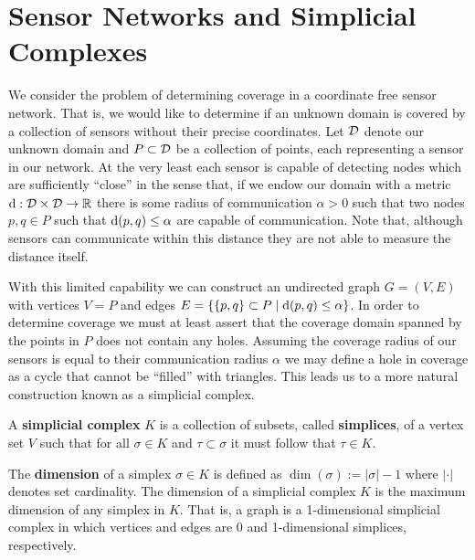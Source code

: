 \section{Sensor Networks and Simplicial Complexes} %
\label{sec:complexes}

We consider the problem of determining coverage in a coordinate free sensor network.
That is, we would like to determine if an unknown domain is covered by a collection of sensors without their precise coordinates.
Let ${\mathcal{D}}$ denote our unknown domain and $P\subset{\mathcal{D}}$ be a collection of points, each representing a sensor in our network.
At the very least each sensor is capable of detecting nodes which are sufficiently ``close'' in the sense that, if we endow our domain with a metric $\mathrm{d}:{\mathcal{D}}\times{\mathcal{D}}\to\mathbb{R}$ there is some radius of communication $\alpha > 0$ such that two nodes $p, q\in P$ such that $\mathrm{d}(p, q) \leq\alpha$ are capable of communication.
Note that, although sensors can communicate within this distance they are not able to measure the distance itself.

With this limited capability we can construct an undirected graph $G=(V,E)$ with vertices $V=P$ and edges $E = \{\{p, q\}\subset P\mid \mathrm{d}(p,q)\leq\alpha\}$.
In order to determine coverage we must at least assert that the coverage domain spanned by the points in $P$ does not contain any holes.
Assuming the coverage radius of our sensors is equal to their communication radius $\alpha$ we may define a hole in coverage as a cycle that cannot be ``filled'' with triangles.
This leads us to a more natural construction known as a simplicial complex.
\begin{definition}
   A \textbf{simplicial complex} $K$ is a collection of subsets, called \textbf{simplices}, of a vertex set $V$ such that for all $\sigma\in K$ and $\tau\subset\sigma$ it must follow that $\tau\in K$.
\end{definition}
The \textbf{dimension} of a simplex $\sigma\in K$ is defined as $\dim(\sigma) := |\sigma|-1$ where $|\cdot|$ denotes set cardinality.
The dimension of a simplicial complex $K$ is the maximum dimension of any simplex in $K$.
That is, a graph is a 1-dimensional simplicial complex in which vertices and edges are 0 and 1-dimensional simplices, respectively.

